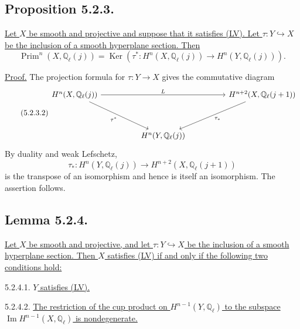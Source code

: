 \subsection*{Proposition 5.2.3.}
\underline{Let $X$ be smooth and projective and suppose that it satisfies
(LV).  Let $\tau:Y\hookrightarrow X$ be the inclusion of a smooth hyperplane
section.  Then}
\begin{equation}\tag{5.2.3.1}
\operatorname{Prim}^n(X,\mathbb Q_\ell(j))
=\operatorname{Ker}\!\left(
\tau^*:H^n(X,\mathbb Q_\ell(j))
\longrightarrow H^n(Y,\mathbb Q_\ell(j))
\right).
\end{equation}

\underline{Proof.}
The projection formula for $\tau:Y\to X$ gives the commutative diagram
\begin{equation}\tag{5.2.3.2}
\begin{tikzcd}[column sep=huge,row sep=huge]
H^n(X,\mathbb Q_\ell(j))
  \arrow[rr,"L"]\arrow[dr,"\tau^*"']
  & {} &
H^{n+2}(X,\mathbb Q_\ell(j+1))
  \arrow[dl,"\tau_*"]\\
{} & H^n(Y,\mathbb Q_\ell(j)) & {}
\end{tikzcd}
\end{equation}
By duality and weak Lefschetz,
\[
\tau_*:H^n(Y,\mathbb Q_\ell(j))
\longrightarrow H^{n+2}(X,\mathbb Q_\ell(j+1))
\]
is the transpose of an isomorphism and hence is itself an isomorphism.  The
assertion follows.

\subsection*{Lemma 5.2.4.}
\underline{Let $X$ be smooth and projective, and let
$\tau:Y\hookrightarrow X$ be the inclusion of a smooth hyperplane section.
Then $X$ satisfies (LV) if and only if the following two conditions hold:}

\smallskip
\noindent
\textup{5.2.4.1.} \underline{$Y$ satisfies (LV).}

\smallskip
\noindent
\textup{5.2.4.2.} \underline{The restriction of the cup product on
$H^{n-1}(Y,\mathbb Q_\ell)$ to the subspace
$\operatorname{Im}H^{n-1}(X,\mathbb Q_\ell)$ is nondegenerate.}

